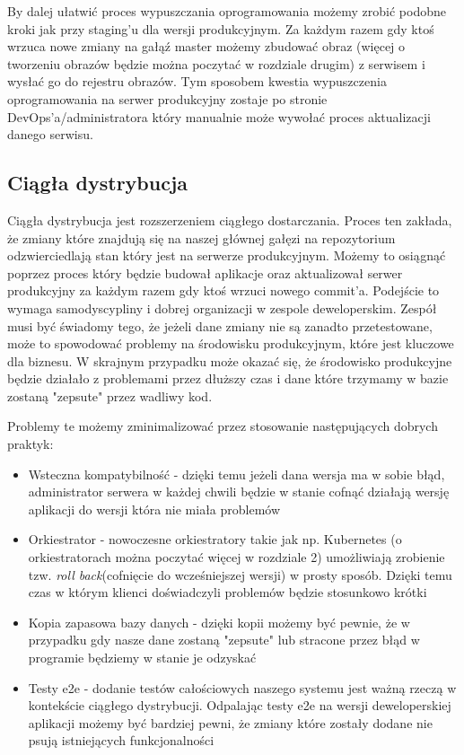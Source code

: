 \par
By dalej ułatwić proces wypuszczania oprogramowania możemy zrobić podobne kroki jak przy staging'u dla wersji produkcyjnym. Za każdym razem gdy ktoś wrzuca nowe zmiany na gałąź master możemy zbudować obraz (więcej o tworzeniu obrazów będzie można poczytać w rozdziale drugim) z serwisem i wysłać go do rejestru obrazów. Tym sposobem kwestia wypuszczenia oprogramowania na serwer produkcyjny zostaje po stronie DevOps'a/administratora który manualnie może wywołać proces aktualizacji danego serwisu. 
\subsection{Ciągła dystrybucja}
Ciągła dystrybucja jest rozszerzeniem ciągłego dostarczania. Proces ten zakłada, że zmiany które znajdują się na naszej głównej gałęzi na repozytorium odzwierciedlają stan który jest na serwerze produkcyjnym. Możemy to osiągnąć poprzez proces który będzie budował aplikacje oraz aktualizował serwer produkcyjny za każdym razem gdy ktoś wrzuci nowego commit'a. Podejście to wymaga samodyscypliny i dobrej organizacji w zespole deweloperskim. Zespół musi być świadomy tego, że jeżeli dane zmiany nie są zanadto przetestowane, może to spowodować problemy na środowisku produkcyjnym, które jest kluczowe dla biznesu. W skrajnym przypadku może okazać się, że środowisko produkcyjne będzie działało z problemami przez dłuższy czas i dane które trzymamy w bazie zostaną "zepsute" przez wadliwy kod.
\par
Problemy te możemy zminimalizować przez stosowanie następujących dobrych praktyk:
\begin{itemize}
    \item Wsteczna kompatybilność - dzięki temu jeżeli dana wersja ma w sobie błąd, administrator serwera w każdej chwili będzie w stanie cofnąć działają wersję aplikacji do wersji która nie miała problemów
    \item Orkiestrator - nowoczesne orkiestratory takie jak np. Kubernetes (o orkiestratorach można poczytać więcej w rozdziale 2) umożliwiają zrobienie tzw. \textit{roll back}(cofnięcie do wcześniejszej wersji) w prosty sposób. Dzięki temu czas w którym klienci doświadczyli problemów będzie stosunkowo krótki
    \item Kopia zapasowa bazy danych - dzięki kopii możemy być pewnie, że w przypadku gdy nasze dane zostaną "zepsute" lub stracone przez błąd w programie będziemy w stanie je odzyskać
    \item Testy e2e - dodanie testów całościowych naszego systemu jest ważną rzeczą w kontekście ciągłego dystrybucji. Odpalając testy e2e na wersji deweloperskiej aplikacji możemy być bardziej pewni, że zmiany które zostały dodane nie psują istniejących funkcjonalności
\end{itemize}
